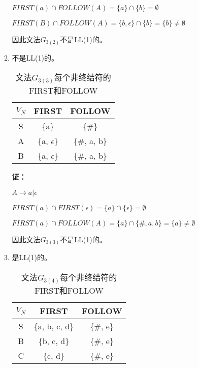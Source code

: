 \begin{enumerate}[1.]
\begin{enumerate}[(1)]
            $FIRST(a) \cap FOLLOW(A) = \{a\} \cap \{b\} = \emptyset$
            
            $FIRST(B) \cap FOLLOW(A) = \{b, \epsilon\} \cap \{b\} = \{b\} \neq \emptyset$
            
            因此文法$G_{3(2)}$不是LL(1)的。
            
            \item 不是LL(1)的。
            \begin{table}[H]
                \centering
                \begin{tabular}{|c|c|c|}
                    \hline
                    $V_N$ & FIRST & FOLLOW \\
                    \hline
                    S & \{a\} & \{\#\} \\
                    \hline
                    A & \{a, $\epsilon$\} & \{\#, a, b\} \\
                    \hline
                    B & \{a, $\epsilon$\} & \{\#, a, b\} \\
                    \hline
                \end{tabular}
                \caption{文法$G_{3(3)}$每个非终结符的FIRST和FOLLOW}
                \label{tab:G3_3FF}
            \end{table}
            
            \textbf{证：}
            
            $A \to a | \epsilon$
            
            $FIRST(a) \cap FIRST(\epsilon) = \{a\} \cap \{\epsilon\} = \emptyset$
            
            $FIRST(a) \cap FOLLOW(A) = \{a\} \cap \{\#, a, b\} = \{a\} \neq \emptyset$
            
            因此文法$G_{3(3)}$不是LL(1)的。
            
            \item 是LL(1)的。
            \begin{table}[H]
                \centering
                \begin{tabular}{|c|c|c|}
                    \hline
                    $V_N$ & FIRST & FOLLOW \\
                    \hline
                    S & \{a, b, c, d\} & \{\#, e\} \\
                    \hline
                    B & \{b, c, d\} & \{\#, e\} \\
                    \hline
                    C & \{c, d\} & \{\#, e\} \\
                    \hline
                \end{tabular}
                \caption{文法$G_{3(4)}$每个非终结符的FIRST和FOLLOW}
                \label{tab:G3_4FF}
            \end{table}
            

\end{enumerate}
\end{enumerate}
